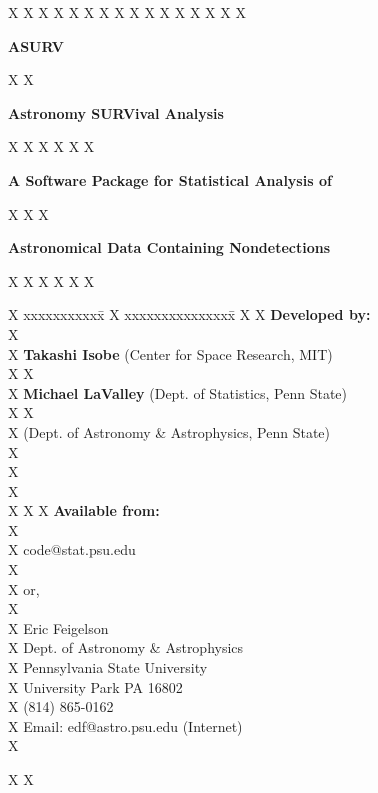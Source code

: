 X
X\marginparwidth 0pt
X\oddsidemargin  0pt
X\evensidemargin  0pt
X\marginparsep 0pt
X\topmargin=0.0in
X\textwidth=6.25in
X\textheight=8.25in
X\pagestyle{plain}
X\parskip=5pt
X\parindent=30pt
X
X
X\thispagestyle{empty}
X
X\centerline{\Huge\bf  ASURV}
X\bigskip
X\centerline{\Huge\bf Astronomy SURVival Analysis }
X
X\bigskip
X\bigskip
X\bigskip
X\bigskip
X\centerline{\LARGE\bf  A Software Package for Statistical Analysis of }
X
X\bigskip
X\centerline{\LARGE\bf  Astronomical Data Containing Nondetections}
X
X\bigskip
X\bigskip
X\bigskip
X\bigskip
X\begin{tabbing}
X      xxxxxxxxxxx\= \kill
X                 \>xxxxxxxxxxxxxxx\=   \kill
X
X      {\Large\bf Developed by: } \\
X    \> \\
X                 \> {\Large\bf Takashi Isobe } (Center for Space Research, MIT)  \\
X
X    \> \\
X           \> {\Large\bf Michael LaValley } (Dept. of Statistics, Penn State)\\
X
X    \> \\
X                 (Dept. of Astronomy \& Astrophysics, Penn State) \\
X    \> \\
X    \> \\
X    \> \\
X
X
X       {\Large\bf Available from: }   \\
X                 \>                   \\
X                 \> code@stat.psu.edu \\
X                 \>                   \\
X                 \>or,                \\
X                 \>                   \\
X                 \> Eric Feigelson     \\
X                 \> Dept. of Astronomy \& Astrophysics  \\
X                 \> Pennsylvania State University \\
X                 \> University Park PA  16802 \\
X                 \> (814) 865-0162 \\
X                 \>  Email:  edf@astro.psu.edu  (Internet)\\
X\end{tabbing}
X\bigskip
X\bigskip
